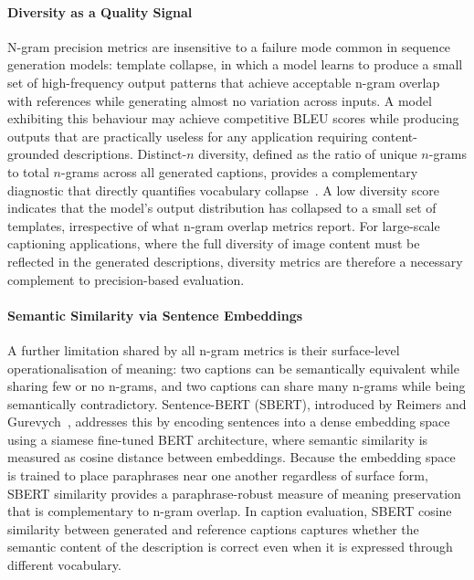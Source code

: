\paragraph{Diversity as a Quality Signal}
N-gram precision metrics are insensitive to a failure mode common 
in sequence generation models: template collapse, in which a model 
learns to produce a small set of high-frequency output patterns 
that achieve acceptable n-gram overlap with references while 
generating almost no variation across inputs. A model exhibiting 
this behaviour may achieve competitive BLEU scores while producing 
outputs that are practically useless for any application requiring 
content-grounded descriptions. Distinct-$n$ diversity, defined as 
the ratio of unique $n$-grams to total $n$-grams across all 
generated captions, provides a complementary diagnostic that 
directly quantifies vocabulary collapse~\cite{Li_2016_DiversityNMT}. 
A low diversity score indicates that the model's output 
distribution has collapsed to a small set of templates, 
irrespective of what n-gram overlap metrics report. For 
large-scale captioning applications, where the full diversity of 
image content must be reflected in the generated descriptions, 
diversity metrics are therefore a necessary complement to 
precision-based evaluation.

\paragraph{Semantic Similarity via Sentence Embeddings}
A further limitation shared by all n-gram metrics is their 
surface-level operationalisation of meaning: two captions can be 
semantically equivalent while sharing few or no n-grams, and two 
captions can share many n-grams while being semantically 
contradictory. Sentence-BERT (SBERT), introduced by Reimers and 
Gurevych~\cite{Reimers_2019_SBERT}, addresses this by encoding 
sentences into a dense embedding space using a siamese 
fine-tuned BERT architecture, where semantic similarity is measured 
as cosine distance between embeddings. Because the embedding space 
is trained to place paraphrases near one another regardless of 
surface form, SBERT similarity provides a paraphrase-robust 
measure of meaning preservation that is complementary to n-gram 
overlap. In caption evaluation, SBERT cosine similarity between 
generated and reference captions captures whether the semantic 
content of the description is correct even when it is expressed 
through different vocabulary.


